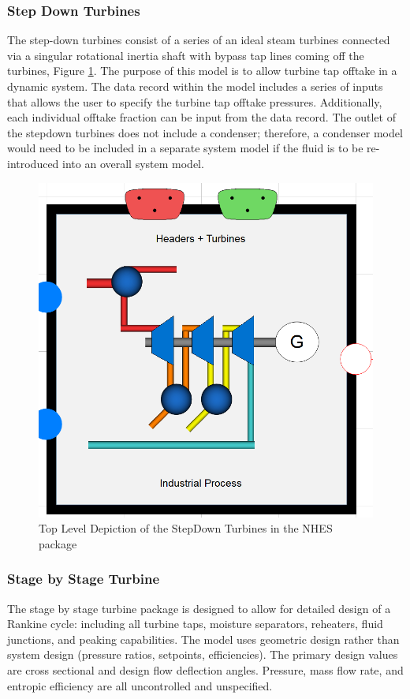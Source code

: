 \subsubsection{Step Down Turbines}

The step-down turbines consist of a series of an ideal steam turbines connected via a singular rotational inertia shaft with bypass tap lines coming off the turbines, Figure \ref{Top View Step Down Turbines}. The purpose of this model is to allow turbine tap offtake in a dynamic system. The data record within the model includes a series of inputs that allows the user to specify the turbine tap offtake pressures. Additionally, each individual offtake fraction can be input from the data record. The outlet of the stepdown turbines does not include a condenser; therefore, a condenser model would need to be included in a separate system model if the fluid is to be re-introduced into an overall system model.
 
\begin{figure}[hbtp]
\centering
\includegraphics[scale=0.3]{pics/HeaderStepdownturbines.png}
\caption{Top Level Depiction of the StepDown Turbines in the NHES package}
\label{Top View Step Down Turbines}
\end{figure}


\subsubsection{Stage by Stage Turbine}
The stage by stage turbine package is designed to allow for detailed design of a Rankine cycle: including all turbine taps, moisture separators, reheaters, fluid junctions, and peaking capabilities. The model uses geometric design rather than system design (pressure ratios, setpoints, efficiencies). The primary design values are cross sectional and design flow deflection angles. Pressure, mass flow rate, and entropic efficiency are all uncontrolled and unspecified. 


